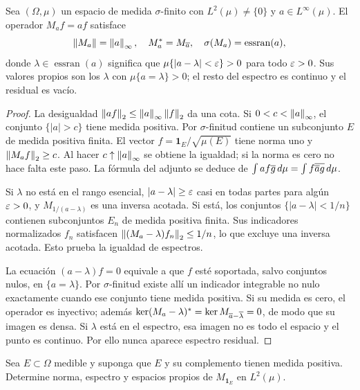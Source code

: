 \begin{teorema}\label{v3:multiplicadores}
Sea $(\Omega,\mu)$ un espacio de medida $\sigma$-finito con $L^2(\mu)\ne\{0\}$ y $a\in L^\infty(\mu)$. El operador $M_af=af$ satisface
\[\left\lVert M_a\right\rVert=\left\lVert a\right\rVert_\infty,\quad M_a^*=M_{\overline{a}},\quad
\sigma(M_a)=\operatorname{essran}(a),
\]
donde $\lambda\in\operatorname{essran}(a)$ significa que $\mu\{|a-\lambda|<\varepsilon\}>0$ para todo $\varepsilon>0$. Sus valores propios son los $\lambda$ con $\mu\{a=\lambda\}>0$; el resto del espectro es continuo y el residual es vacío.
\end{teorema}
\begin{proof}
La desigualdad $\left\lVert af\right\rVert_2\le\left\lVert a\right\rVert_\infty\left\lVert f\right\rVert_2$ da una cota. Si $0<c<\left\lVert a\right\rVert_\infty$, el conjunto $\{|a|>c\}$ tiene medida positiva. Por $\sigma$-finitud contiene un subconjunto $E$ de medida positiva finita. El vector $f=\boldsymbol1_E/\sqrt{\mu(E)}$ tiene norma uno y $\left\lVert M_af\right\rVert_2\ge c$. Al hacer $c\uparrow\left\lVert a\right\rVert_\infty$ se obtiene la igualdad; si la norma es cero no hace falta este paso. La fórmula del adjunto se deduce de
$\int af\overline{g}\,d\mu=\int f\overline{\overline{a} g}\,d\mu$.

Si $\lambda$ no está en el rango esencial, $|a-\lambda|\ge\varepsilon$ casi en todas partes para algún $\varepsilon>0$, y $M_{1/(a-\lambda)}$ es una inversa acotada. Si está, los conjuntos $\{|a-\lambda|<1/n\}$ contienen subconjuntos $E_n$ de medida positiva finita. Sus indicadores normalizados $f_n$ satisfacen $\left\lVert(M_a-\lambda)f_n\right\rVert_2\le1/n$, lo que excluye una inversa acotada. Esto prueba la igualdad de espectros.

La ecuación $(a-\lambda)f=0$ equivale a que $f$ esté soportada, salvo conjuntos nulos, en $\{a=\lambda\}$. Por $\sigma$-finitud existe allí un indicador integrable no nulo exactamente cuando ese conjunto tiene medida positiva. Si su medida es cero, el operador es inyectivo; además $\ker(M_a-\lambda)^*=\ker M_{\overline{a}-\overline{\lambda}}=0$, de modo que su imagen es densa. Si $\lambda$ está en el espectro, esa imagen no es todo el espacio y el punto es continuo. Por ello nunca aparece espectro residual.
\end{proof}

\begin{ejercicio}\label{ej:v3-ampl-multiplicador}
Sea $E\subset\Omega$ medible y suponga que $E$ y su complemento tienen medida positiva. Determine norma, espectro y espacios propios de $M_{\boldsymbol1_E}$ en $L^2(\mu)$.
\end{ejercicio}


